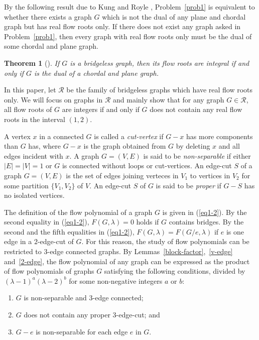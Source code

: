 \documentclass[11pt]{article}
\newtheorem{theo}{Theorem}
\newcommand {\red} {\textcolor{red}}
\def \setgr {\mathscr{R}}
\newcommand {\relabel}[1] {\label{#1} \red{[*: #1]}}\newcommand {\rebibitem}[1] {\bibitem{#1} \red{[*: #1]}}%
\def\relabel {\label} \def\rebibitem {\bibitem}  %
\begin{document}
By the following result due to Kung and Royle \cite{kung},
Problem~\ref{prob1} is equivalent to whether 
there exists a graph $G$ which is not the dual of any plane 
and chordal graph but has real flow roots only. 
If there does not exist any graph asked in Problem~\ref{prob1}, 
then every graph with real flow roots only must be the dual of some chordal and plane graph.


\begin{theo}
[\cite{kung}]
\relabel{kungroyle-theo}
If $G$ is a bridgeless graph, then 
its flow roots are integral
if and only if $G$ is the dual of a chordal and plane graph. 
\end{theo} 


In this paper, 
let $\setgr$ be the family of bridgeless  
graphs which have real flow roots only. 
We will focus on graphs in $\setgr$ and 
mainly show that 
for any graph $G\in \setgr$,
all flow roots of $G$ are integers 
if and only if 
$G$ does not contain any real flow roots in the interval 
$(1,2)$. 


A vertex $x$ in a connected $G$ is called a 
{\it cut-vertex} if $G-x$ has more components than $G$ has,
where $G-x$ is the graph obtained from $G$ by deleting 
$x$ and all edges incident with $x$. 
A graph $G=(V,E)$ is said to be 
{\it non-separable} if 
either $|E|=|V|=1$ or 
$G$ is connected without loops or cut-vertices.
An edge-cut $S$ of a graph $G=(V,E)$ is the set of edges 
joining verteces in $V_1$ to vertices in $V_2$
for some  partition $\{V_1, V_2\}$ of $V$. 
An edge-cut $S$ of $G$ is said 
to be {\it proper} if $G-S$ has no isolated vertices.

The definition of the flow polynomial of a graph $G$ 
is given in (\ref{eq1-2}).
By the second equality in (\ref{eq1-2}),
$F(G,\lambda)=0$ holds if $G$ contains bridges. 
By the second and the fifth equalities in (\ref{eq1-2}),
$F(G,\lambda)=F(G/e,\lambda)$ if $e$ is one edge 
in a $2$-edge-cut of $G$. 
For this reason, 
the study of flow polynomials can be restricted to 
$3$-edge connected graphs. 
By Lemmas~\ref{block-factor},~\ref{v-edge} and~\ref{2-edge}, 
the flow polynomial of any graph can be expressed as the product 
of flow polynomials of graphs $G$ satisfying the following 
conditions,  divided by $(\lambda-1)^a(\lambda-2)^b$ for some 
non-negative integers $a$ or $b$:
\begin{enumerate}
\item $G$ is non-separable and 
$3$-edge connected;
\item 
$G$ does not contain any proper $3$-edge-cut; and 
\item $G-e$ is non-separable for each edge $e$ in $G$.
\end{enumerate}
\end{document}
